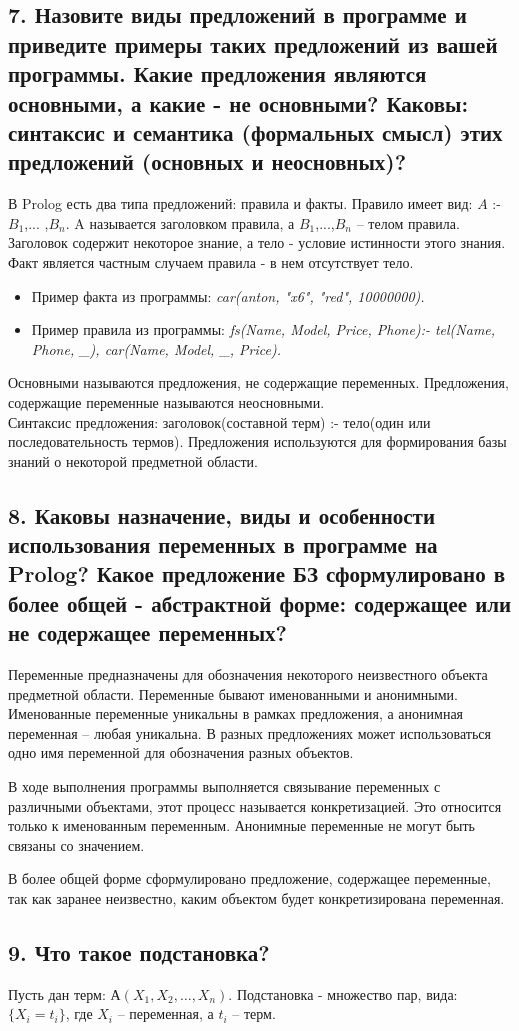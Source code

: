 \subsection*{7. Назовите виды предложений в программе и приведите примеры таких предложений из вашей программы. Какие предложения являются основными, а какие - не основными? Каковы: синтаксис и семантика (формальных смысл) этих предложений (основных и неосновных)?}

В Prolog есть два типа предложений: правила и факты. Правило имеет вид: $A$ :- $B_{1}$,... ,$B_{n}$. 
A называется заголовком правила, а $B_{1}$,...,$B_{n}$ – телом правила. Заголовок содержит некоторое знание, а тело - условие истинности этого знания. Факт является частным случаем правила - в нем отсутствует тело. 

\begin{itemize}
	\item Пример факта из программы: \emph{car(anton, "x6", "red", 10000000). }
	\item Пример правила из программы: \emph{fs(Name, Model, Price, Phone):- tel(Name, Phone, \_),  car(Name, Model,  \_, Price). }
\end{itemize}


Основными называются предложения, не содержащие переменных. Предложения, содержащие переменные называются неосновными.\\

Синтаксис предложения: заголовок(составной терм) :- тело(один или последовательность термов). Предложения используются для формирования базы знаний о некоторой предметной области.

\subsection*{8. Каковы назначение, виды и особенности использования переменных в программе на Prolog? Какое предложение БЗ сформулировано в более общей - абстрактной форме: содержащее или не содержащее переменных?}

Переменные предназначены для обозначения некоторого неизвестного объекта предметной области. Переменные бывают именованными и анонимными. Именованные переменные уникальны в рамках предложения, а анонимная переменная – любая уникальна. В разных предложениях может использоваться одно имя переменной для обозначения разных объектов.

В ходе выполнения программы выполняется связывание переменных с различными объектами, этот процесс называется конкретизацией. Это относится только к именованным переменным. Анонимные переменные не могут быть связаны со значением.

В более общей форме сформулировано предложение, содержащее переменные, так как заранее неизвестно, каким объектом будет конкретизирована переменная.

\subsection*{9. Что такое подстановка?}

Пусть дан терм: $А(X_1, X_2,  \dots ,X_n)$.
Подстановка - множество пар, вида: $\{X _ i = t _ i\}$, где $X_i$ –   переменная, а $t_i$ –  терм.	